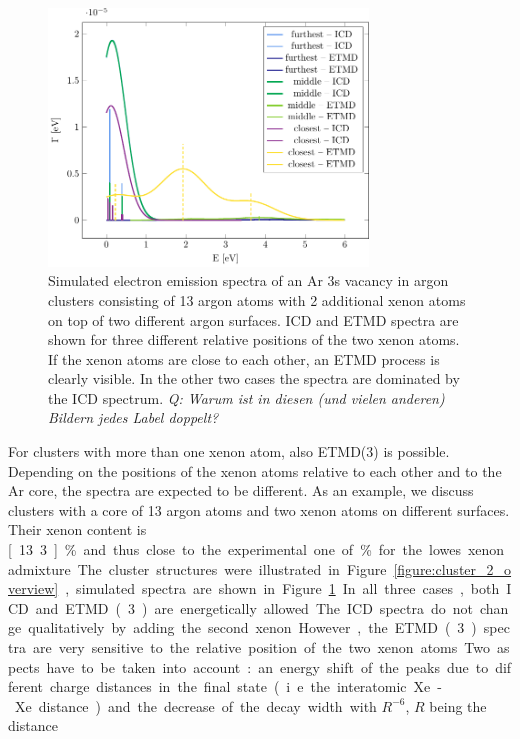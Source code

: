 \begin{figure}[ht]
 \centering
 \includegraphics[width=8.5cm]{pics/2tops.pdf}
 \caption{Simulated electron emission spectra of an Ar 3s vacancy in 
          argon clusters consisting of 13
          argon atoms with 2 additional xenon atoms on top of two different
          argon surfaces. ICD and ETMD spectra are shown for three
          different relative positions of the two xenon atoms. If 
          the xenon atoms are close to each other, an ETMD process is
          clearly visible. In the other two cases the spectra are dominated by
          the ICD spectrum.
          {\it Q: Warum ist in diesen (und vielen anderen) Bildern jedes Label doppelt?}}
 \label{figure:2tops}
\end{figure}
%
For clusters with more than one xenon atom, also ETMD(3) is possible.
Depending on the positions of the xenon atoms relative to each other and to the Ar core, the spectra are expected to be different.
As an example, we discuss clusters with a core of 13 argon atoms and two xenon atoms on different surfaces. 
Their xenon content is \unit[13.3]{\%} and thus close to the experimental one of \unit[10-12]{\%} for the lowes xenon admixture.
The cluster structures were illustrated in Figure \ref{figure:cluster_2_overview}, simulated spectra are shown in Figure \ref{figure:2tops}.
In all three cases, both ICD and ETMD(3) are energetically allowed. The ICD
spectra do not change qualitatively by adding the second xenon.
However, the ETMD(3) spectra
are very sensitive to the relative position of the two xenon atoms.
Two aspects have to be taken into account: an energy shift of the peaks due
to different charge distances in the final state (i.e. the interatomic Xe-Xe
distance) and the decrease of the decay width with $R^{-6}$, $R$ being the distance
